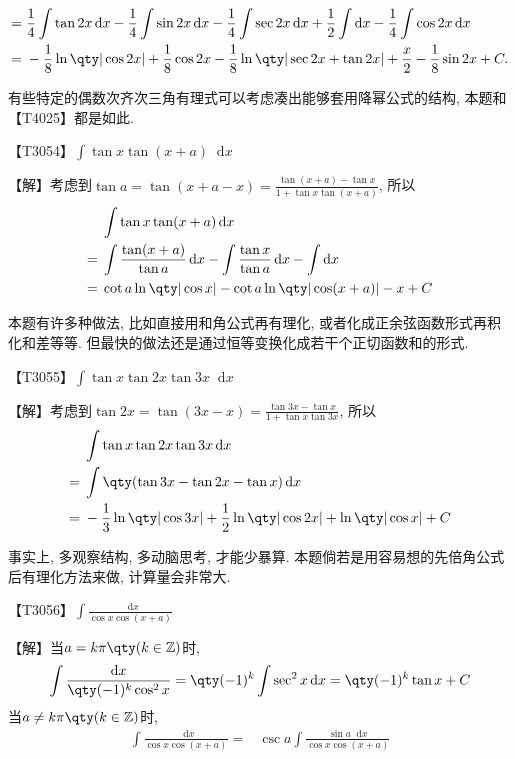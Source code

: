 \documentclass{ctexbook}
\newcommand*{\dif}{\mathop{}\!\mathrm{d}}
\begin{document}
{\begin{align*}
={}&\frac{1}{4}\int\tan{2x}\dif{x}-\frac{1}{4}\int\sin{2x}\dif{x}-\frac{1}{4}\int\sec{2x}\dif{x}+\frac{1}{2}\int\dif{x}-\frac{1}{4}\int\cos{2x}\dif{x}\\
={}&-\frac{1}{8}\ln\qty|\cos{2x}|+\frac{1}{8}\cos{2x}-\frac{1}{8}\ln\qty|\sec{2x}+\tan{2x}|+\frac{x}{2}-\frac{1}{8}\sin{2x}+C
.\end{align*}\par
{\kaishu 有些特定的偶数次齐次三角有理式可以考虑凑出能够套用降幂公式的结构, 本题和【T4025】都是如此. \par}
【T3054】$\int\tan{x}\tan(x+a)\dif{x}$\par
【解】考虑到$\tan{a}=\tan(x+a-x)=\frac{\tan(x+a)-\tan{x}}{1+\tan{x}\tan(x+a)}$, 所以
\begin{align*}
{}&\int\tan{x}\tan(x+a)\dif{x}\\
={}&\int\frac{\tan(x+a)}{\tan{a}}\dif{x}-\int\frac{\tan{x}}{\tan{a}}\dif{x}-\int\dif{x}\\
={}&\cot{a}\ln\qty|\cos{x}|-\cot{a}\ln\qty|\cos(x+a)|-x+C
\end{align*}\par
{\kaishu 本题有许多种做法, 比如直接用和角公式再有理化, 或者化成正余弦函数形式再积化和差等等. 但最快的做法还是通过恒等变换化成若干个正切函数和的形式. \par}
【T3055】$\int\tan{x}\tan{2x}\tan{3x}\dif{x}$\par
【解】考虑到$\tan{2x}=\tan(3x-x)=\frac{\tan{3x}-\tan{x}}{1+\tan{x}\tan{3x}}$, 所以
\begin{align*}
{}&\int\tan{x}\tan{2x}\tan{3x}\dif{x}\\
={}&\int\qty(\tan{3x}-\tan{2x}-\tan{x})\dif{x}\\
={}&-\frac{1}{3}\ln\qty|\cos{3x}|+\frac{1}{2}\ln\qty|\cos{2x}|+\ln\qty|\cos{x}|+C
\end{align*}\par
{\kaishu 事实上, 多观察结构, 多动脑思考, 才能少暴算. 本题倘若是用容易想的先倍角公式后有理化方法来做, 计算量会非常大. \par}
【T3056】$\int\frac{\dif{x}}{\cos{x}\cos(x+a)}$\par
【解】当$a=k\pi\qty(k\in\mathbb{Z})$时, 
\begin{align*}
\int\frac{\dif{x}}{\qty(-1)^{k}\cos^{2}{x}}=\qty(-1)^{k}\int\sec^{2}{x}\dif{x}=\qty(-1)^{k}\tan{x}+C
\end{align*}
当$a\ne k\pi\qty(k\in\mathbb{Z})$时, 
\begin{align*}
\int\frac{\dif{x}}{\cos{x}\cos(x+a)}={}&\csc{a}\int\frac{\sin{a}\dif{x}}{\cos{x}\cos(x+a)}\\

\end{align*}}
\end{document}
